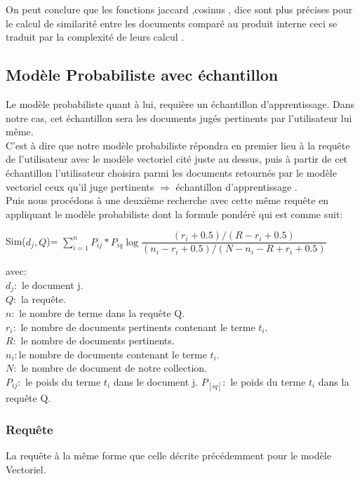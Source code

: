 \documentclass[12pt,a4paper,oneside]{article}
\begin{document}
On peut conclure que les fonctions  jaccard ,cosinus , dice sont plus précises pour le calcul de similarité entre les  documents comparé au produit interne ceci se traduit par la complexité de leurs calcul .



\newpage

\subsection{Modèle Probabiliste avec échantillon}

Le modèle probabiliste quant à lui, requière un échantillon d'apprentissage. Dans notre cas,
cet échantillon sera les documents jugés pertinents par l'utilisateur lui même.\\

C'est à dire que notre modèle probabiliste répondra en premier lieu à la requête de l'utilisateur
avec le modèle vectoriel cité juste au dessus, puis à partir de cet échantillon l'utilisateur choisira parmi les documents
retournés par le modèle vectoriel ceux qu'il juge pertinents $\Rightarrow$ échantillon d'apprentissage .\\

Puis nous procédons à une deuxième recherche avec cette même
requête en appliquant le modèle probabiliste dont la formule pondéré qui est comme suit:\\

\begin{center}
	Sim($d_{j},Q$)= $\sum_{i=1}^{n} P_{ij} * P_{iq} \log \dfrac{(r_{i}+0.5)/(R-r_{i}+0.5)}{(n_{i}-r_{i}+0.5)/(N-n_{i}-R+r_{i}+0.5)}$
\end{center}

avec:\\
$d_{j} :$ le document j.\\
$Q :$ la requête.\\
$n :$ le nombre de terme dans la requête Q.\\
$r_{i} :$ le nombre de documents pertinents contenant le terme $t_{i}$.\\
$R :$ le nombre de documents pertinents.\\
$n_{i} :$le nombre de documents contenant le terme $t_{i}$.\\
$N :$ le nombre de document de notre collection.\\
$P_{ij} :$ le poids du terme $t_{i}$ dans le document j.
$P_[iq] :$ le poids du terme $t_{i}$ dans la requête Q.

\subsubsection*{Requête}
La requête à la même forme que celle décrite précédemment pour le modèle Vectoriel.
\end{document}
